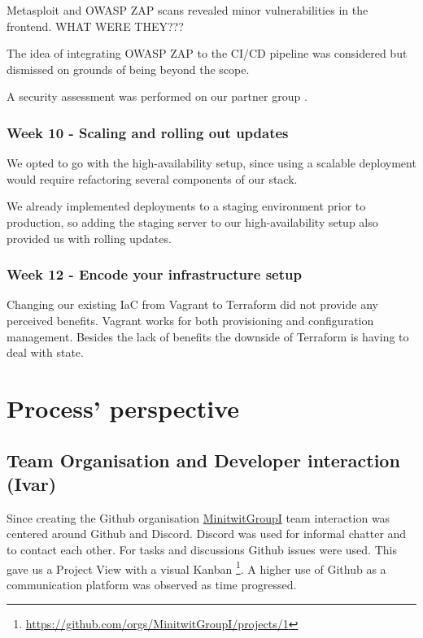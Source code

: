 \documentclass{article}
\begin{document}
Metasploit and OWASP ZAP scans revealed minor vulnerabilities in the frontend. WHAT WERE THEY???

The idea of integrating OWASP ZAP to the CI/CD pipeline was considered but dismissed on grounds of being beyond the scope.

A security assessment was performed on our partner group \label{appendix:security assessment}. 


\subsubsection{Week 10 - Scaling and rolling out updates }

We opted to go with the high-availability setup, since using a scalable deployment would require refactoring several components of our stack.

We already implemented deployments to a staging environment prior to production, so adding the staging server to our high-availability setup also provided us with rolling updates.  

\subsubsection{Week 12 - Encode your infrastructure setup }

Changing our existing IaC from Vagrant to Terraform did not provide any perceived benefits. Vagrant works for both provisioning and configuration management. Besides the lack of benefits the downside of Terraform is having to deal with state. 

\section{Process' perspective} \label{cicd}

\subsection{Team Organisation and Developer interaction (Ivar)} 

Since creating the Github organisation \href{https://github.com/MinitwitGroupI/}{MinitwitGroupI} team interaction was centered around Github and Discord. Discord was used for informal chatter and to contact each other. For tasks and discussions Github issues were used. This gave us a Project View with a visual Kanban \footnote{\url{https://github.com/orgs/MinitwitGroupI/projects/1}}. A higher use of Github as a communication platform was observed as time progressed. 
\end{document}
